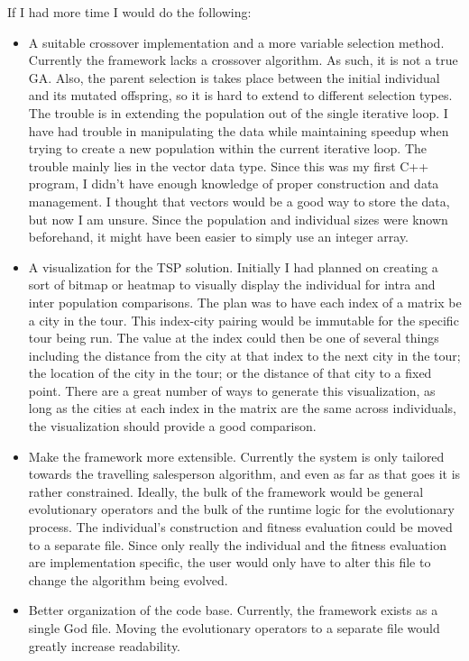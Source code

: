\documentclass[10pt,letterpaper]{article}
\begin{document}
If I had more time I would do the following:
\begin{itemize}
\item A suitable crossover implementation and a more variable selection method. Currently the framework lacks a crossover algorithm. As such, it is not a true GA. Also, the parent selection is takes place between the initial individual and its mutated offspring, so it is hard to extend to different selection types. The trouble is in extending the population out of the single iterative loop. I have had trouble in manipulating the data while maintaining speedup when trying to create a new population within the current iterative loop. The trouble mainly lies in the vector data type. Since this was my first C++ program, I didn't have enough knowledge of proper construction and data management. I thought that vectors would be a good way to store the data, but now I am unsure. Since the population and individual sizes were known beforehand, it might have been easier to simply use an integer array.
\item A visualization for the TSP solution. Initially I had planned on creating a sort of bitmap or heatmap to visually display the individual for intra and inter population comparisons. The plan was to have each index of a matrix be a city in the tour. This index-city pairing would be immutable for the specific tour being run. The value at the index could then be one of several things including the distance from the city at that index to the next city in the tour; the location of the city in the tour; or the distance of that city to a fixed point. There are a great number of ways to generate this visualization, as long as the cities at each index in the matrix are the same across individuals, the visualization should provide a good comparison.
\item Make the framework more extensible. Currently the system is only tailored towards the travelling salesperson algorithm, and even as far as that goes it is rather constrained. Ideally, the bulk of the framework would be general evolutionary operators and the bulk of the runtime logic for the evolutionary process. The individual's construction and fitness evaluation could be moved to a separate file. Since only really the individual and the fitness evaluation are implementation specific, the user would only have to alter this file to change the algorithm being evolved.
\item Better organization of the code base. Currently, the framework exists as a single God file. Moving the evolutionary operators to a separate file would greatly increase readability.
\end{itemize}
\end{document}
